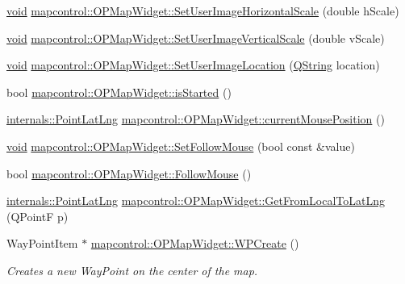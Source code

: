 \begin{DoxyCompactItemize}
\item 
\hyperlink{group___u_a_v_objects_plugin_ga444cf2ff3f0ecbe028adce838d373f5c}{void} \hyperlink{group___o_p_map_widget_gad61028ad754a5341e96c7f2e0e8c13f0}{mapcontrol\-::\-O\-P\-Map\-Widget\-::\-Set\-User\-Image\-Horizontal\-Scale} (double h\-Scale)
\item 
\hyperlink{group___u_a_v_objects_plugin_ga444cf2ff3f0ecbe028adce838d373f5c}{void} \hyperlink{group___o_p_map_widget_gaac2d5997b77a7b661f1d983316e4f825}{mapcontrol\-::\-O\-P\-Map\-Widget\-::\-Set\-User\-Image\-Vertical\-Scale} (double v\-Scale)
\item 
\hyperlink{group___u_a_v_objects_plugin_ga444cf2ff3f0ecbe028adce838d373f5c}{void} \hyperlink{group___o_p_map_widget_gab46d43fc65b333d32a79056ca882caa0}{mapcontrol\-::\-O\-P\-Map\-Widget\-::\-Set\-User\-Image\-Location} (\hyperlink{group___u_a_v_objects_plugin_gab9d252f49c333c94a72f97ce3105a32d}{\-Q\-String} location)
\item 
bool \hyperlink{group___o_p_map_widget_ga1a79fb1b73da4c902626f6dcee9fa372}{mapcontrol\-::\-O\-P\-Map\-Widget\-::is\-Started} ()
\item 
\hyperlink{structinternals_1_1_point_lat_lng}{internals\-::\-Point\-Lat\-Lng} \hyperlink{group___o_p_map_widget_gabb9370f367fc42a3987983e79db0828a}{mapcontrol\-::\-O\-P\-Map\-Widget\-::current\-Mouse\-Position} ()
\item 
\hyperlink{group___u_a_v_objects_plugin_ga444cf2ff3f0ecbe028adce838d373f5c}{void} \hyperlink{group___o_p_map_widget_ga9713d4bd6a80debb60fbb66d3e55ebd3}{mapcontrol\-::\-O\-P\-Map\-Widget\-::\-Set\-Follow\-Mouse} (bool const \&value)
\item 
bool \hyperlink{group___o_p_map_widget_gab4d31649441240def7d389c4d814c6a2}{mapcontrol\-::\-O\-P\-Map\-Widget\-::\-Follow\-Mouse} ()
\item 
\hyperlink{structinternals_1_1_point_lat_lng}{internals\-::\-Point\-Lat\-Lng} \hyperlink{group___o_p_map_widget_ga350ef32ca621e11b3d5a2d3fe4aeaca6}{mapcontrol\-::\-O\-P\-Map\-Widget\-::\-Get\-From\-Local\-To\-Lat\-Lng} (\-Q\-Point\-F p)
\item 
\-Way\-Point\-Item $\ast$ \hyperlink{group___o_p_map_widget_ga7a23e7347fa5504a5af7d58e66161fa2}{mapcontrol\-::\-O\-P\-Map\-Widget\-::\-W\-P\-Create} ()
\begin{DoxyCompactList}\small\item\em \-Creates a new \-Way\-Point on the center of the map. \end{DoxyCompactList}\item 

\end{DoxyCompactItemize}
